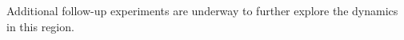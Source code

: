 \documentclass[a4paper,11pt,oneside]{book}
\begin{document}


Additional follow-up experiments are underway to further explore the dynamics in this region.




\ifstandalone
\begin{small}

\end{small}
\fi
\end{document}
